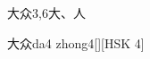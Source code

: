\begin{entry}{大众}{3,6}{⼤、⼈}
  \begin{phonetics}{大众}{da4 zhong4}[][HSK 4]
  \end{phonetics}
\end{entry}
